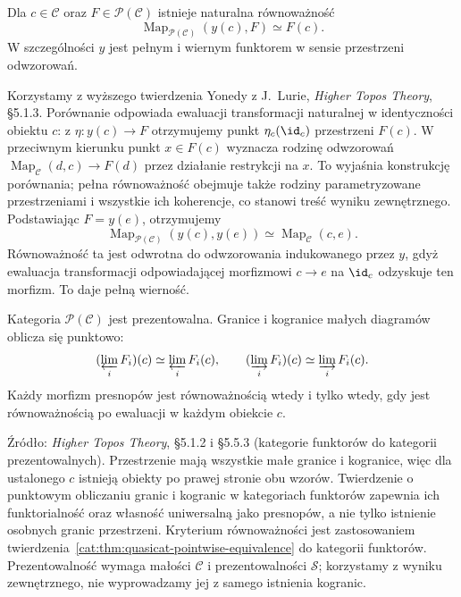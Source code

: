 \begin{twierdzenie}\label{cat:thm:infty-topos-yoneda}
Dla $c\in\mathcal C$ oraz $F\in\mathcal P(\mathcal C)$ istnieje naturalna równoważność
\begin{equation}\label{cat:eq:infty-topos-yoneda}
 \operatorname{Map}_{\mathcal P(\mathcal C)}(y(c),F)\simeq F(c).
\end{equation}
W szczególności $y$ jest pełnym i wiernym funktorem w sensie przestrzeni odwzorowań.
\end{twierdzenie}

Korzystamy z wyższego twierdzenia Yonedy z J.~Lurie, \emph{Higher Topos Theory}, \S5.1.3. Porównanie odpowiada ewaluacji transformacji naturalnej w identyczności obiektu $c$: z $\eta:y(c)\to F$ otrzymujemy punkt $\eta_c(\id_c)$ przestrzeni $F(c)$. W przeciwnym kierunku punkt $x\in F(c)$ wyznacza rodzinę odwzorowań $\operatorname{Map}_{\mathcal C}(d,c)\to F(d)$ przez działanie restrykcji na $x$. To wyjaśnia konstrukcję porównania; pełna równoważność obejmuje także rodziny parametryzowane przestrzeniami i wszystkie ich koherencje, co stanowi treść wyniku zewnętrznego. Podstawiając $F=y(e)$, otrzymujemy
\[
 \operatorname{Map}_{\mathcal P(\mathcal C)}(y(c),y(e))
 \simeq \operatorname{Map}_{\mathcal C}(c,e).
\]
Równoważność ta jest odwrotna do odwzorowania indukowanego przez $y$, gdyż ewaluacja transformacji odpowiadającej morfizmowi $c\to e$ na $\id_c$ odzyskuje ten morfizm. To daje pełną wierność.

\begin{twierdzenie}\label{cat:thm:infty-presheaf-presentable}
Kategoria $\mathcal P(\mathcal C)$ jest prezentowalna. Granice i kogranice małych diagramów oblicza się punktowo:
\[
 (\varprojlim_i F_i)(c)\simeq\varprojlim_i F_i(c),
 \qquad
 (\varinjlim_i F_i)(c)\simeq\varinjlim_i F_i(c).
\]
Każdy morfizm presnopów jest równoważnością wtedy i tylko wtedy, gdy jest równoważnością po ewaluacji w każdym obiekcie $c$.
\end{twierdzenie}

Źródło: \emph{Higher Topos Theory}, \S5.1.2 i \S5.5.3 (kategorie funktorów do kategorii prezentowalnych). Przestrzenie mają wszystkie małe granice i kogranice, więc dla ustalonego $c$ istnieją obiekty po prawej stronie obu wzorów. Twierdzenie o punktowym obliczaniu granic i kogranic w kategoriach funktorów zapewnia ich funktorialność oraz własność uniwersalną jako presnopów, a nie tylko istnienie osobnych granic przestrzeni. Kryterium równoważności jest zastosowaniem twierdzenia~\ref{cat:thm:quasicat-pointwise-equivalence} do kategorii funktorów. Prezentowalność wymaga małości $\mathcal C$ i prezentowalności $\mathcal S$; korzystamy z wyniku zewnętrznego, nie wyprowadzamy jej z samego istnienia kogranic.

